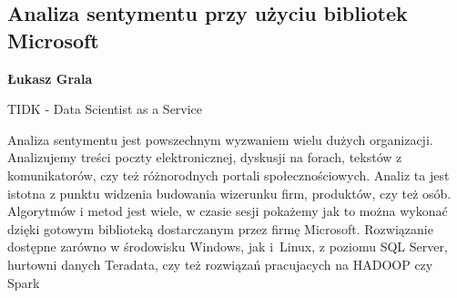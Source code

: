 \documentclass[\main/boa.tex]{subfiles}
\begin{document}
\subsection{Analiza sentymentu przy użyciu bibliotek Microsoft}

\begin{minipage}{0.915\textwidth}
	\centering
  {\bf {} Łukasz Grala}
\end{minipage}



\begin{affiliations}
\begin{minipage}{0.915\textwidth}
\centering
TIDK - Data Scientist as a Service  \\[-2pt]
\end{minipage}
\end{affiliations}

\vskip 0.3cm

Analiza sentymentu jest powszechnym wyzwaniem wielu dużych organizacji. Analizujemy treści poczty elektronicznej, dyskusji na forach, tekstów z komunikatorów, czy też różnorodnych portali społecznościowych. Analiz ta jest istotna z punktu widzenia budowania wizerunku firm, produktów, czy też osób. Algorytmów i metod jest wiele, w czasie sesji pokażemy jak to można wykonać dzięki gotowym biblioteką dostarczanym przez firmę Microsoft. Rozwiązanie dostępne zarówno w środowisku Windows, jak i~Linux, z poziomu SQL Server, hurtowni danych Teradata, czy też rozwiązań pracujacych na HADOOP czy Spark
\end{document}
